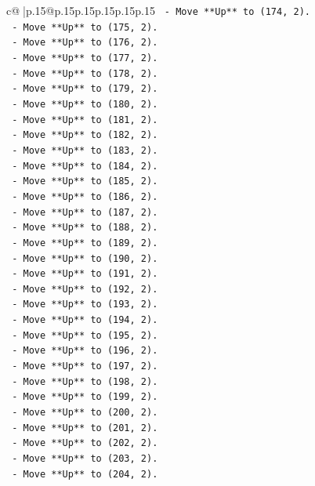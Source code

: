 \documentclass{article}
\begin{document}
{\begin{supertabular}{c@{$\;$}|p{.15\linewidth}@{}p{.15\linewidth}p{.15\linewidth}p{.15\linewidth}p{.15\linewidth}p{.15\linewidth}}
{{{\texttt{    {-} Move **Up** to (174, 2).} \\
\texttt{    {-} Move **Up** to (175, 2).} \\
\texttt{    {-} Move **Up** to (176, 2).} \\
\texttt{    {-} Move **Up** to (177, 2).} \\
\texttt{    {-} Move **Up** to (178, 2).} \\
\texttt{    {-} Move **Up** to (179, 2).} \\
\texttt{    {-} Move **Up** to (180, 2).} \\
\texttt{    {-} Move **Up** to (181, 2).} \\
\texttt{    {-} Move **Up** to (182, 2).} \\
\texttt{    {-} Move **Up** to (183, 2).} \\
\texttt{    {-} Move **Up** to (184, 2).} \\
\texttt{    {-} Move **Up** to (185, 2).} \\
\texttt{    {-} Move **Up** to (186, 2).} \\
\texttt{    {-} Move **Up** to (187, 2).} \\
\texttt{    {-} Move **Up** to (188, 2).} \\
\texttt{    {-} Move **Up** to (189, 2).} \\
\texttt{    {-} Move **Up** to (190, 2).} \\
\texttt{    {-} Move **Up** to (191, 2).} \\
\texttt{    {-} Move **Up** to (192, 2).} \\
\texttt{    {-} Move **Up** to (193, 2).} \\
\texttt{    {-} Move **Up** to (194, 2).} \\
\texttt{    {-} Move **Up** to (195, 2).} \\
\texttt{    {-} Move **Up** to (196, 2).} \\
\texttt{    {-} Move **Up** to (197, 2).} \\
\texttt{    {-} Move **Up** to (198, 2).} \\
\texttt{    {-} Move **Up** to (199, 2).} \\
\texttt{    {-} Move **Up** to (200, 2).} \\
\texttt{    {-} Move **Up** to (201, 2).} \\
\texttt{    {-} Move **Up** to (202, 2).} \\
\texttt{    {-} Move **Up** to (203, 2).} \\
\texttt{    {-} Move **Up** to (204, 2).} \\
}}}
\end{supertabular}}
\end{document}
